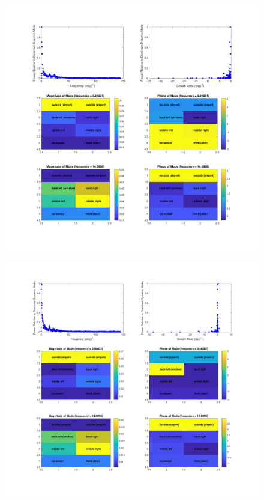 \documentclass{article}
\begin{document}
\begin{figure}[!htbp]
\centering
\includegraphics[width=\linewidth]{Figures/100D.pdf}
\caption{}\label{100D}
\end{figure}

\begin{figure}[!htbp]
\centering
\includegraphics[width=\linewidth]{Figures/200D.pdf}
\caption{}\label{200D}
\end{figure}
\end{document}
